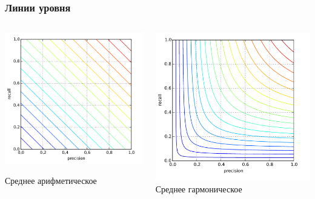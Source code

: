 \documentclass{beamer}
\begin{document}
	\begin{frame}
		\frametitle{Линии уровня}
		
		\begin{columns}
			\begin{column}{0.5\textwidth}
				\includegraphics[width=\textwidth]{img/fbeta_avg.png}
				
				Среднее арифметическое
			\end{column}
			\begin{column}{0.5\textwidth}
				\includegraphics[width=\textwidth]{img/fbeta_harm.png}
				Среднее гармоническое
			\end{column}
		\end{columns}
		
	\end{frame}
	
\end{document}
